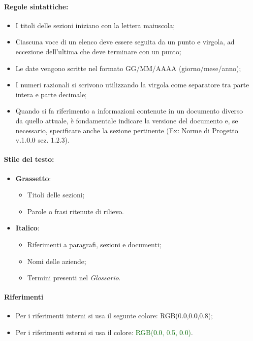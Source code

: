 \paragraph*{Regole sintattiche:}
\begin{itemize}
    \item I titoli delle sezioni iniziano con la lettera maiuscola;
    \item Ciascuna voce di un elenco deve essere seguita da un punto e virgola, ad eccezione dell'ultima che deve terminare con un punto;
    \item Le date vengono scritte nel formato GG/MM/AAAA (giorno/mese/anno);
    \item I numeri razionali si scrivono utilizzando la virgola come separatore tra parte intera e parte decimale;
    \item Quando si fa riferimento a informazioni contenute in un documento diverso da quello attuale, è fondamentale indicare la versione del documento e, se necessario, specificare anche la sezione pertinente (Ex: Norme di Progetto v.1.0.0 sez. 1.2.3).
\end{itemize}

\paragraph*{Stile del testo:}
\begin{itemize}
    \item \textbf{Grassetto}:
    \begin{itemize}
        \item Titoli delle sezioni;
        \item Parole o frasi ritenute di rilievo.
    \end{itemize}
    \item \textbf{Italico}:
    \begin{itemize}
        \item Riferimenti a paragrafi, sezioni e documenti;
        \item Nomi delle aziende;
        \item Termini presenti nel \textit{Glossario}.
    \end{itemize}
\end{itemize}

\paragraph*{Riferimenti}
    \begin{itemize}
        \item Per i riferimenti interni si usa il segunte colore: \textcolor{navyblue}{RGB(0.0,0.0,0.8)};
        \item Per i riferimenti esterni si usa il colore: \textcolor{darkgreen}{RGB(0.0, 0.5, 0.0)}.
\end{itemize}

